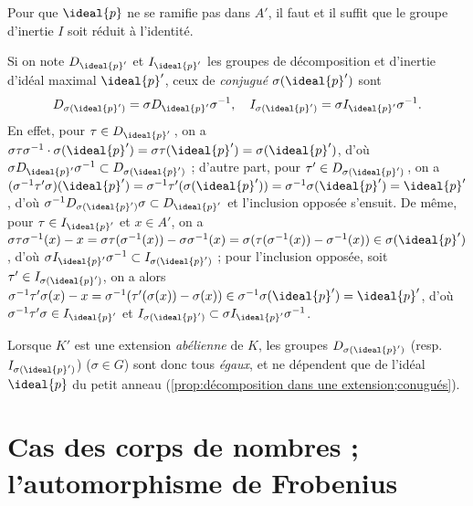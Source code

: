 \documentclass[11pt, %
  title in boldface,
  theorem in new line,
  theorem numbering = section,
  number theorems separately,
  simple name,
]{beaulivre}
\begin{document}
    \begin{corollary}\label{cor:ramification et groupe d'inertie}
        Pour que \( \ideal{p} \) ne se ramifie pas dans \( A' \), il faut et il suffit que le groupe d'inertie \( I \) soit réduit à l'identité.
    \end{corollary}

    \begin{remark}
        Si on note \( D_{\ideal{p}'} \) et \( I_{\ideal{p}'} \) les groupes de décomposition et d'inertie d'idéal maximal \( \ideal{p}' \), ceux de \emph{conjugué} \( \sigma(\ideal{p}') \) sont
        \begin{equation}
            D_{\sigma(\ideal{p}')} = \sigma D_{\ideal{p}'} \sigma^{-1}, \quad
            I_{\sigma(\ideal{p}')} = \sigma I_{\ideal{p}'} \sigma^{-1}.
        \end{equation}
        En effet, pour \( \tau \in D_{\ideal{p}'} \)\,, on a \( \sigma \tau \sigma^{-1} \cdot \sigma(\ideal{p}') = \sigma\tau(\ideal{p}') = \sigma(\ideal{p}') \), d'où \( \sigma D_{\ideal{p}'} \sigma^{-1} \subset D_{\sigma(\ideal{p}')} \) ; d'autre part, pour \( \tau' \in D_{\sigma(\ideal{p}')} \)\,, on a \( (\sigma^{-1} \tau' \sigma)(\ideal{p}') = \sigma^{-1} \tau' (\sigma(\ideal{p}')) = \sigma^{-1} \sigma(\ideal{p}') = \ideal{p}' \), d'où \( \sigma^{-1} D_{\sigma(\ideal{p}')} \sigma \subset D_{\ideal{p}'} \) et l'inclusion opposée s'ensuit. De même, pour \( \tau \in I_{\ideal{p}'} \) et \( x \in A' \), on a \( \sigma\tau\sigma^{-1}(x) - x = \sigma\tau(\sigma^{-1}(x)) - \sigma\sigma^{-1}(x) = \sigma(\tau(\sigma^{-1}(x))-\sigma^{-1}(x)) \in \sigma(\ideal{p}') \), d'où \( \sigma I_{\ideal{p}'} \sigma^{-1} \subset I_{\sigma(\ideal{p}')} \) ; pour l'inclusion opposée, soit \( \tau' \in I_{\sigma(\ideal{p}')} \), on a alors \( \sigma^{-1} \tau' \sigma(x) - x = \sigma^{-1}(\tau'(\sigma(x))-\sigma(x)) \in \sigma^{-1} \sigma(\ideal{p}') = \ideal{p}' \), d'où \( \sigma^{-1} \tau' \sigma \in I_{\ideal{p}'} \) et \( I_{\sigma(\ideal{p}')} \subset \sigma I_{\ideal{p}'} \sigma^{-1} \).

        Lorsque \( K' \) est une extension \emph{abélienne} de \( K \), les groupes \( D_{\sigma(\ideal{p}')} \) (resp. \( I_{\sigma(\ideal{p}')} \)) (\( \sigma \in G \)) sont donc tous \emph{égaux}, et ne dépendent que de l'idéal \( \ideal{p} \) du petit anneau (\cref{prop:décomposition dans une extension;conugués}).
    \end{remark}

\section{Cas des corps de nombres ; l'automorphisme de Frobenius}
\end{document}
